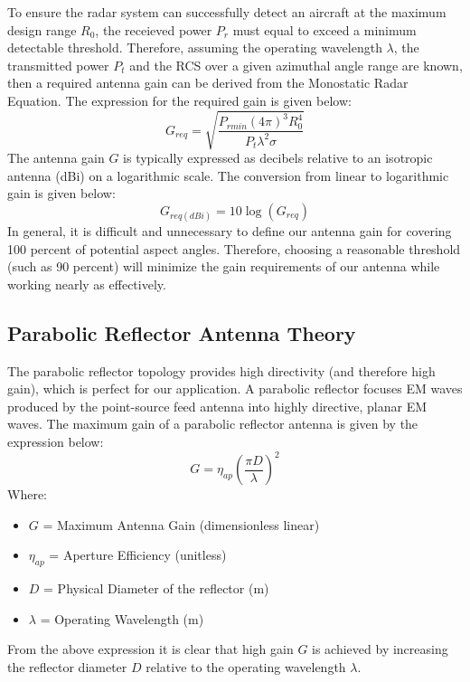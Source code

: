 \documentclass[a4paper]{article}
\begin{document}
	To ensure the radar system can successfully detect an aircraft at the maximum design range $R_0$, the receieved power $P_r$ must equal to exceed a minimum detectable threshold. Therefore, assuming the operating wavelength $\lambda$, the transmitted power $P_t$ and the RCS over a given azimuthal angle range are known, then a required antenna gain can be derived from the Monostatic Radar Equation. The expression for the required gain is given below:
	\begin{equation}
		G_{req} = \sqrt{\frac{P_{rmin} (4\pi)^3 R_0^4}{P_t \lambda^2 \sigma}}
	\end{equation}
	The antenna gain $G$ is typically expressed as decibels relative to an isotropic antenna (dBi) on a logarithmic scale. The conversion from linear to logarithmic gain is given below:
	\begin{equation}
		G_{req (dBi)} = 10\log(G_{req})
	\end{equation}
	In general, it is difficult and unnecessary to define our antenna gain for covering 100 percent of potential aspect angles. Therefore, choosing a reasonable threshold (such as 90 percent) will minimize the gain requirements of our antenna while working nearly as effectively.
	
	\subsection{Parabolic Reflector Antenna Theory}
	The parabolic reflector topology provides high directivity (and therefore high gain), which is perfect for our application. A parabolic reflector focuses EM waves produced by the point-source feed antenna into highly directive, planar EM waves. The maximum gain of a parabolic reflector antenna is given by the expression below:
	\begin{equation}
		G = \eta_{ap} (\frac{\pi D}{\lambda})^2
	\end{equation}
	Where:
	\begin{itemize}
		\item $G$ = Maximum Antenna Gain (dimensionless linear)
		\item $\eta_{ap}$ = Aperture Efficiency (unitless)
		\item $D$ = Physical Diameter of the reflector (m)
		\item $\lambda$ = Operating Wavelength (m)
	\end{itemize}
	From the above expression it is clear that high gain $G$ is achieved by increasing the reflector diameter $D$ relative to the operating wavelength $\lambda$.
	
\end{document}
